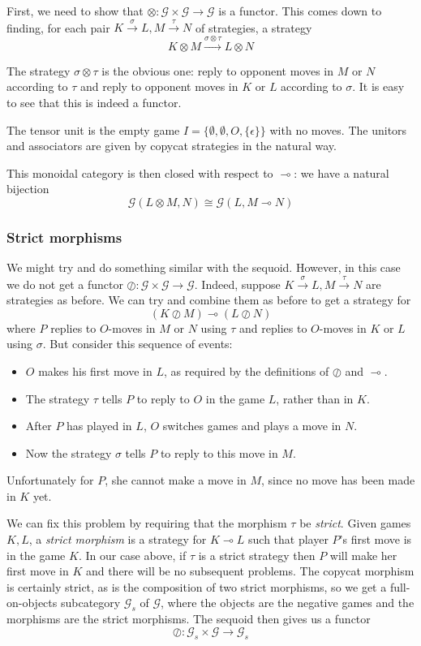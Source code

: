 \documentclass[11pt]{article} %
\theoremstyle{plain} %
\theoremstyle{definition} %
\theoremstyle{exercisestyle}
\newcommand{\map}[3]{#2\xrightarrow{#1} #3}
\newcommand*\from{\colon}
\newcommand{\cmap}[3]{#1\from{}#2\to{}#3}
\newcommand{\tensor}{\otimes}
\newcommand{\sequoid}{\oslash}
\renewcommand{\implies}{\multimap}
\newcommand{\G}{\mathcal G}
\begin{document}
First, we need to show that $\cmap{\tensor}{\G\times\G}{\G}$ is a functor.  This comes down to finding, for each pair $\map{\sigma}{K}{L},\map{\tau}{M}{N}$ of strategies, a strategy 
\[
  \map{\sigma\tensor\tau}{K\tensor M}{L\tensor N}
\]

The strategy $\sigma\tensor\tau$ is the obvious one: reply to opponent moves in $M$ or $N$ according to $\tau$ and reply to opponent moves in $K$ or $L$ according to $\sigma$.  It is easy to see that this is indeed a functor.

The tensor unit is the empty game $I=\{\emptyset,\emptyset,O,\{\epsilon\}\}$ with no moves.  The unitors and associators are given by copycat strategies in the natural way.

This monoidal category is then closed with respect to $\implies$: we have a natural bijection
\[
  \G(L\tensor M,N)\cong\G(L,M\implies N)
\]

\subsubsection{Strict morphisms}

We might try and do something similar with the sequoid.  However, in this case we do not get a functor $\cmap{\sequoid}{\G\times\G}{\G}$.  Indeed, suppose $\map{\sigma}{K}{L},\map{\tau}{M}{N}$ are strategies as before.  We can try and combine them as before to get a strategy for
\[
  (K\sequoid M) \implies (L\sequoid N)
\]
where $P$ replies to $O$-moves in $M$ or $N$ using $\tau$ and replies to $O$-moves in $K$ or $L$ using $\sigma$.  But consider this sequence of events:
\begin{itemize}
  \item $O$ makes his first move in $L$, as required by the definitions of $\sequoid$ and $\implies$.
  \item The strategy $\tau$ tells $P$ to reply to $O$ in the game $L$, rather than in $K$.
  \item After $P$ has played in $L$, $O$ switches games and plays a move in $N$.  
  \item Now the strategy $\sigma$ tells $P$ to reply to this move in $M$.
\end{itemize}

Unfortunately for $P$, she cannot make a move in $M$, since no move has been made in $K$ yet.  

We can fix this problem by requiring that the morphism $\tau$ be \emph{strict}.  Given games $K,L$, a \emph{strict morphism} is a strategy for $K\implies L$ such that player $P$'s first move is in the game $K$.  In our case above, if $\tau$ is a strict strategy then $P$ will make her first move in $K$ and there will be no subsequent problems.  The copycat morphism is certainly strict, as is the composition of two strict morphisms, so we get a full-on-objects subcategory $\G_s$ of $\G$, where the objects are the negative games and the morphisms are the strict morphisms.  The sequoid then gives us a functor
\[
  \cmap{\sequoid}{\G_s\times \G}{\G_s}
\]
\end{document}
